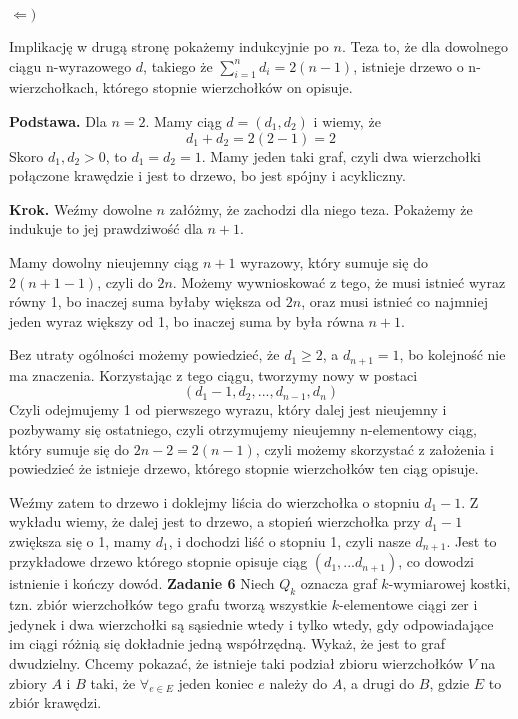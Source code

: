 \documentclass[12pt,a4paper]{article}
\begin{document}
\( \Leftarrow )   \)

Implikację w drugą stronę pokażemy indukcyjnie po \(n\). Teza to, że dla dowolnego ciągu n-wyrazowego \(d\), takiego że \( \sum_{i=1}^n d_i = 2(n-1) \), istnieje drzewo o n-wierzchołkach, którego stopnie wierzchołków on opisuje.

\textbf{Podstawa.} Dla \( n = 2 \). Mamy ciąg \( d = ( d_1, d_2 ) \) i wiemy, że 
\[
	d_1 + d_2 = 2( 2 - 1) = 2
\]
Skoro \( d_1, d_2 > 0 \), to \( d_1 = d_2 = 1 \). Mamy jeden taki graf, czyli dwa wierzchołki połączone krawędzie i jest to drzewo, bo jest spójny i acykliczny.

\textbf{Krok.} Weźmy dowolne \( n \) załóżmy, że zachodzi dla niego teza. Pokażemy że indukuje to jej prawdziwość dla \( n + 1 \).

Mamy dowolny nieujemny ciąg \( n + 1 \) wyrazowy, który sumuje się do \( 2( n + 1 - 1) \), czyli do \(2n\). Możemy wywnioskować z tego, że musi istnieć wyraz równy 1, bo inaczej suma byłaby większa od \(2n\), oraz musi istnieć co najmniej jeden wyraz większy od 1, bo inaczej suma by była równa \(n+1\).

Bez utraty ogólności możemy powiedzieć, że \( d_1 \geq 2 \), a \( d_{n+1} = 1 \), bo kolejność nie ma znaczenia. Korzystając z tego ciągu, tworzymy nowy w postaci
\[
	(d_1 - 1, d_2, ... , d_{n-1}, d_n)
\]
Czyli odejmujemy 1 od pierwszego wyrazu, który dalej jest nieujemny i pozbywamy się ostatniego, czyli otrzymujemy nieujemny n-elementowy ciąg, który sumuje się do \( 2n - 2 = 2(n - 1) \), czyli możemy skorzystać z założenia i powiedzieć że istnieje drzewo, którego stopnie wierzchołków ten ciąg opisuje.

Weźmy zatem to drzewo i doklejmy liścia do wierzchołka o stopniu \( d_1 - 1 \). Z wykładu wiemy, że dalej jest to drzewo, a stopień wierzchołka przy \( d_1 -1 \) zwiększa się o 1, mamy \( d_1 \), i dochodzi liść o stopniu 1, czyli nasze \(d_{n+1}\). Jest to przykładowe drzewo którego stopnie opisuje ciąg \( (d_1, ... d_{n+1}) \), co dowodzi istnienie i kończy dowód.
\newpage
\noindent
\textbf{Zadanie 6} Niech \( Q_k \) oznacza graf \(k\)-wymiarowej kostki, tzn. zbiór wierzchołków tego grafu tworzą wszystkie \(k\)-elementowe ciągi zer i jedynek i dwa wierzchołki są sąsiednie wtedy i tylko wtedy, gdy odpowiadające im ciągi różnią się dokładnie jedną współrzędną. Wykaż, że jest to graf dwudzielny.
\vskip 0.5cm
Chcemy pokazać, że istnieje taki podział zbioru wierzchołków \(V\) na zbiory \(A\) i \(B\) taki, że \( \forall_{e\in E} \) jeden koniec \( e\) należy do \(A\), a drugi do \(B\), gdzie \(E\) to zbiór krawędzi.
\end{document}
